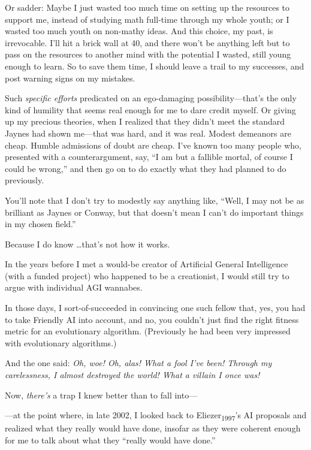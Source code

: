 {
 Or sadder: Maybe I just wasted too much time on setting up the
resources to support me, instead of studying math full-time through my
whole youth; or I wasted too much youth on non-mathy ideas. And this
choice, my past, is irrevocable. I'll hit a brick wall
at 40, and there won't be anything left but to pass on
the resources to another mind with the potential I wasted, still young
enough to learn. So to save them time, I should leave a trail to my
successes, and post warning signs on my mistakes.}

{
 Such \textit{specific efforts} predicated on an ego-damaging
possibility---that's the only kind of humility that
seems real enough for me to dare credit myself. Or giving up my
precious theories, when I realized that they didn't
meet the standard Jaynes had shown me---that was hard, and it was real.
Modest demeanors are cheap. Humble admissions of doubt are cheap.
I've known too many people who, presented with a
counterargument, say, ``I am but a fallible mortal, of
course I could be wrong,'' and then go on to do
exactly what they had planned to do previously.}

{
 You'll note that I don't try to
modestly say anything like, ``Well, I may not be as
brilliant as Jaynes or Conway, but that doesn't mean I
can't do important things in my chosen
field.''}

{
 Because I do know \ldots that's not how it works.}

\myendsectiontext


{
 In the years before I met a would-be creator of Artificial General
Intelligence (with a funded project) who happened to be a creationist,
I would still try to argue with individual AGI wannabes. }

{
 In those days, I sort-of-succeeded in convincing one such fellow
that, yes, you had to take Friendly AI into account, and no, you
couldn't just find the right fitness metric for an
evolutionary algorithm. (Previously he had been very impressed with
evolutionary algorithms.)}

{
 And the one said: \textit{Oh, woe! Oh, alas! What a fool
I've been! Through my carelessness, I almost destroyed
the world! What a villain I once was!}}

{
 Now, \textit{there's} a trap I knew better than to
fall into---}

{
 {}---at the point where, in late 2002, I looked back to
Eliezer\textsubscript{1997}'s AI proposals and realized
what they really would have done, insofar as they were coherent enough
for me to talk about what they ``really would have
done.''}

